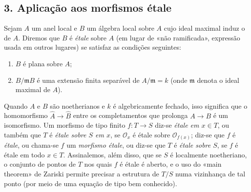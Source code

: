 \documentclass[11pt,twoside,openany]{book}
\numberwithin{equation}{section}
\newcommand{\src}[1]{%
  \phantomsection\hypertarget{src:#1}{}%
  \marginpar{\raggedleft\footnotesize\sffamily #1}%
}
\theoremstyle{plain}
\theoremstyle{definition}
\theoremstyle{remark}
\newcommand{\FgaUnitKey}{frontmatter}
\renewcommand{\src}[1]{%
  \phantomsection\hypertarget{src:\FgaUnitKey:#1}{}%
  \marginpar{\raggedleft\footnotesize\sffamily #1}%
}
\begin{document}
\src{308}
\subsection*{3. Aplicação aos morfismos étale}

Sejam $A$ um anel local e $B$ um álgebra local sobre $A$ cujo ideal maximal
induz o de $A$. Diremos que $B$ é \emph{étale} sobre $A$ (em lugar de
«não ramificada», expressão usada em outros lugares) se satisfaz as condições
seguintes:
\begin{enumerate}
\item[(i)] $B$ é plana sobre $A$;
\item[(ii)] $B/\mathfrak mB$ é uma extensão finita separável de
$A/\mathfrak m=k$ (onde $\mathfrak m$ denota o ideal maximal de $A$).
\end{enumerate}
Quando $A$ e $B$ são noetherianos e $k$ é algebricamente fechado, isso
significa que o homomorfismo $\widehat A\longrightarrow\widehat B$ entre os
completamentos que prolonga $A\longrightarrow B$ é um isomorfismo. Um morfismo de
tipo finito $f:T\longrightarrow S$ diz-se \emph{étale em $x\in T$}, ou também
que $T$ é \emph{étale sobre $S$ em $x$}, se $\mathcal O_x$ é étale sobre
$\mathcal O_{f(x)}$; diz-se que $f$ é \emph{étale}, ou chama-se $f$ um
\emph{morfismo étale}, ou diz-se que $T$ é \emph{étale sobre $S$}, se $f$ é
étale em todo $x\in T$. Assinalemos, além disso, que se $S$ é localmente
noetheriano, o conjunto de pontos de $T$ nos quais $f$ é étale é aberto, e
o uso do «main theorem» de Zariski permite precisar a estrutura de $T/S$
numa vizinhança de tal ponto (por meio de uma equação de tipo bem conhecido).
\end{document}
